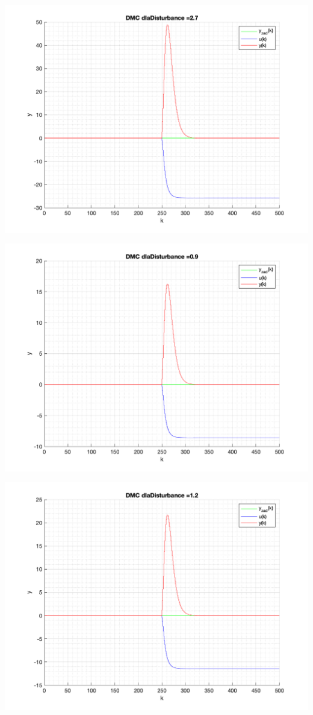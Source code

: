 \documentclass[a4paper, 11pt]{article}
\begin{document}
\begin{enumerate}
 \includegraphics[width=\linewidth]{./ModelsP4_Disturbance/P4_DMC_Disturbance_2_7_png.png} 
 
 \includegraphics[width=\linewidth]{./ModelsP4_Disturbance/P4_DMC_Disturbance_0_9_png.png} 
 
 \includegraphics[width=\linewidth]{./ModelsP4_Disturbance/P4_DMC_Disturbance_1_2_png.png} 
 

\end{enumerate}
\end{document}
